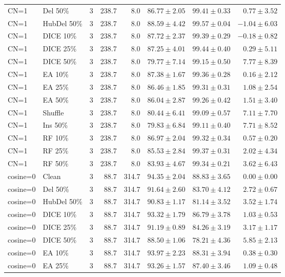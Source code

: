 {\begin{longtable}{llrrrrrr}
CN=1 & Del 50\% & 3 & 238.7 & 8.0 & $86.77\pm2.05$ & $99.41\pm0.33$ & $0.77\pm3.52$ \\
CN=1 & HubDel 50\% & 3 & 238.7 & 8.0 & $88.59\pm4.42$ & $99.57\pm0.04$ & $-1.04\pm6.03$ \\
CN=1 & DICE 10\% & 3 & 238.7 & 8.0 & $87.72\pm2.37$ & $99.39\pm0.29$ & $-0.18\pm0.82$ \\
CN=1 & DICE 25\% & 3 & 238.7 & 8.0 & $87.25\pm4.01$ & $99.44\pm0.40$ & $0.29\pm5.11$ \\
CN=1 & DICE 50\% & 3 & 238.7 & 8.0 & $79.77\pm7.14$ & $99.15\pm0.50$ & $7.77\pm8.39$ \\
CN=1 & EA 10\% & 3 & 238.7 & 8.0 & $87.38\pm1.67$ & $99.36\pm0.28$ & $0.16\pm2.12$ \\
CN=1 & EA 25\% & 3 & 238.7 & 8.0 & $86.46\pm1.85$ & $99.31\pm0.31$ & $1.08\pm2.54$ \\
CN=1 & EA 50\% & 3 & 238.7 & 8.0 & $86.04\pm2.87$ & $99.26\pm0.42$ & $1.51\pm3.40$ \\
CN=1 & Shuffle & 3 & 238.7 & 8.0 & $80.44\pm6.41$ & $99.09\pm0.57$ & $7.11\pm7.70$ \\
CN=1 & Ins 50\% & 3 & 238.7 & 8.0 & $79.83\pm6.84$ & $99.11\pm0.40$ & $7.71\pm8.52$ \\
CN=1 & RF 10\% & 3 & 238.7 & 8.0 & $86.97\pm2.04$ & $99.32\pm0.34$ & $0.57\pm0.20$ \\
CN=1 & RF 25\% & 3 & 238.7 & 8.0 & $85.53\pm2.84$ & $99.37\pm0.31$ & $2.02\pm4.34$ \\
CN=1 & RF 50\% & 3 & 238.7 & 8.0 & $83.93\pm4.67$ & $99.34\pm0.21$ & $3.62\pm6.43$ \\
cosine=0 & Clean & 3 & 88.7 & 314.7 & $94.35\pm2.04$ & $88.83\pm3.65$ & $0.00\pm0.00$ \\
cosine=0 & Del 50\% & 3 & 88.7 & 314.7 & $91.64\pm2.60$ & $83.70\pm4.12$ & $2.72\pm0.67$ \\
cosine=0 & HubDel 50\% & 3 & 88.7 & 314.7 & $90.83\pm1.17$ & $81.14\pm3.52$ & $3.52\pm1.74$ \\
cosine=0 & DICE 10\% & 3 & 88.7 & 314.7 & $93.32\pm1.79$ & $86.79\pm3.78$ & $1.03\pm0.53$ \\
cosine=0 & DICE 25\% & 3 & 88.7 & 314.7 & $91.19\pm0.89$ & $84.26\pm3.19$ & $3.17\pm1.17$ \\
cosine=0 & DICE 50\% & 3 & 88.7 & 314.7 & $88.50\pm1.06$ & $78.21\pm4.36$ & $5.85\pm2.13$ \\
cosine=0 & EA 10\% & 3 & 88.7 & 314.7 & $93.97\pm2.23$ & $88.31\pm3.94$ & $0.38\pm0.30$ \\
cosine=0 & EA 25\% & 3 & 88.7 & 314.7 & $93.26\pm1.57$ & $87.40\pm3.46$ & $1.09\pm0.48$ \\

\end{longtable}}
